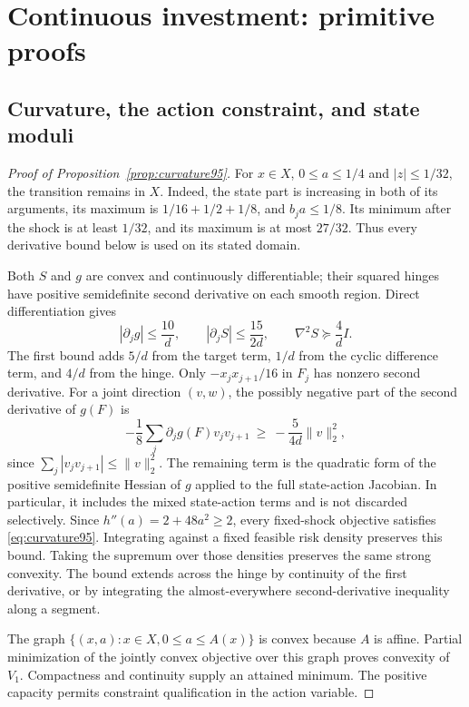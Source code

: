 \section{Continuous investment: primitive proofs}\label{sec:proofs95}
\subsection{Curvature, the action constraint, and state moduli}
\begin{proof}[Proof of Proposition~\ref{prop:curvature95}]
For $x\in X$, $0\leq a\leq1/4$ and $|z|\leq1/32$, the transition remains in $X$. Indeed, the state part is increasing in both of its arguments, its maximum is $1/16+1/2+1/8$, and $b_ja\leq1/8$. Its minimum after the shock is at least $1/32$, and its maximum is at most $27/32$. Thus every derivative bound below is used on its stated domain.

Both $S$ and $g$ are convex and continuously differentiable; their squared hinges have positive semidefinite second derivative on each smooth region. Direct differentiation gives
\[
 |\partial_jg|\leq\frac{10}{d},\qquad
 |\partial_jS|\leq\frac{15}{2d},\qquad
 \nabla^2S\succeq\frac4d I.
\]
The first bound adds $5/d$ from the target term, $1/d$ from the cyclic difference term, and $4/d$ from the hinge. Only $-x_jx_{j+1}/16$ in $F_j$ has nonzero second derivative. For a joint direction $(v,w)$, the possibly negative part of the second derivative of $g(F)$ is
\[
 -\frac18\sum_j\partial_jg(F)v_jv_{j+1}
 \ \geq\ -\frac{5}{4d}\|v\|_2^2,
\]
since $\sum_j|v_jv_{j+1}|\leq\|v\|_2^2$. The remaining term is the quadratic form of the positive semidefinite Hessian of $g$ applied to the full state-action Jacobian. In particular, it includes the mixed state-action terms and is not discarded selectively. Since $h''(a)=2+48a^2\geq2$, every fixed-shock objective satisfies \eqref{eq:curvature95}. Integrating against a fixed feasible risk density preserves this bound. Taking the supremum over those densities preserves the same strong convexity. The bound extends across the hinge by continuity of the first derivative, or by integrating the almost-everywhere second-derivative inequality along a segment.

The graph $\{(x,a):x\in X,0\leq a\leq A(x)\}$ is convex because $A$ is affine. Partial minimization of the jointly convex objective over this graph proves convexity of $V_1$. Compactness and continuity supply an attained minimum. The positive capacity permits constraint qualification in the action variable.


\end{proof}
